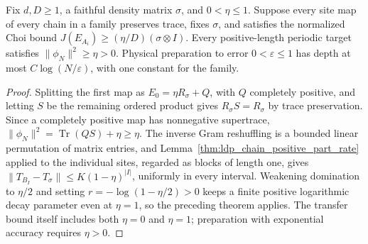 \begin{lemma}
    \label{thm:ldp_inhomogeneous_doeblin_preparation}
    \leanok
    Fix $d,D\ge1$, a faithful density matrix $\sigma$, and $0<\eta\le1$.
    Suppose every site map of every chain in a family preserves trace,
    fixes $\sigma$, and satisfies the normalized Choi bound
    $J(E_{A_i})\ge(\eta/D)(\sigma\otimes I)$.
    Every positive-length periodic target satisfies $\|\phi_N\|^2\ge\eta>0$.
    Physical preparation to error
    $0<\varepsilon\le1$ has depth at most $C\log(N/\varepsilon)$,
    with one constant for the family.
\end{lemma}
\begin{proof}\leanok
    Splitting the first map as $E_0=\eta R_\sigma+Q$, with $Q$ completely
    positive, and letting $S$ be the remaining ordered product gives
    $R_\sigma S=R_\sigma$ by trace preservation. Since a completely positive map has
    nonnegative supertrace, $\|\phi_N\|^2=\operatorname{Tr}(QS)+\eta\ge\eta$.
    The inverse Gram reshuffling is a bounded linear permutation of matrix
    entries, and Lemma~\ref{thm:ldp_chain_positive_part_rate} applied to the
    individual sites, regarded as blocks of length one, gives
    $\|T_{B_I}-T_\sigma\|\le K(1-\eta)^{|I|}$, uniformly in every
    interval. Weakening domination to $\eta/2$ and setting
    $r=-\log(1-\eta/2)>0$ keeps a finite positive logarithmic decay parameter
    even at $\eta=1$, so the preceding theorem applies.
    The transfer bound itself includes both $\eta=0$ and $\eta=1$;
    preparation with exponential accuracy requires $\eta>0$.
\end{proof}
